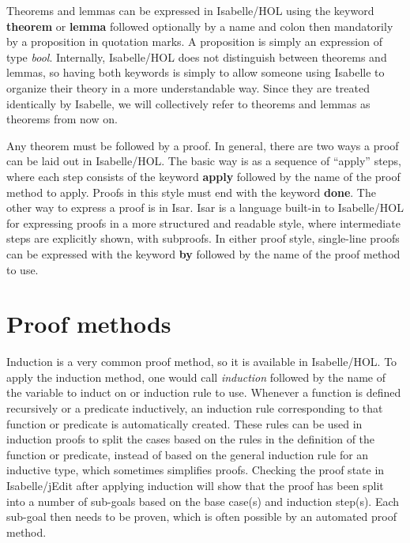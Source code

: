 \documentclass{article}
\begin{document}
Theorems and lemmas can be expressed in Isabelle/HOL using the keyword
\textbf{theorem} or \textbf{lemma} followed optionally by a name and colon then
mandatorily by a proposition in quotation
marks. A proposition is simply an expression of type \textit{bool}. Internally,
Isabelle/HOL does not distinguish between theorems and lemmas, so having both
keywords is simply to allow someone using Isabelle to organize their theory in
a more understandable way. Since they are treated identically by Isabelle, we
will collectively refer to theorems and lemmas as theorems from now on.

Any theorem must be followed by a proof. In general, there are two ways a proof
can be laid out in Isabelle/HOL. The basic way is as a sequence of ``apply''
steps, where each step consists of the keyword \textbf{apply} followed by the
name of the proof method to apply. Proofs in this style must end with the
keyword \textbf{done}. The other way to express a proof is in Isar. Isar is a
language built-in to Isabelle/HOL for expressing proofs in a more structured
and readable style, where intermediate steps are explicitly shown, with
subproofs. In either proof style, single-line proofs can be expressed with the
keyword \textbf{by} followed by the name of the proof method to use.

\section{Proof methods}

Induction is a very common proof method, so it is available in Isabelle/HOL. To
apply the induction method, one would call \textit{induction} followed by the 
name of the variable to induct on or induction rule to use. Whenever a function 
is defined recursively or a predicate inductively, an induction rule 
corresponding to that function or predicate is automatically created. These 
rules can be used in induction proofs to split the cases based on the rules in 
the definition of the function or predicate, instead of based on the general 
induction rule for an inductive type, which sometimes simplifies proofs. 
Checking the proof state in Isabelle/jEdit after 
applying induction will show that the proof has been split into a number of 
sub-goals based on the base case(s) and induction step(s). Each sub-goal then 
needs to be proven, which is often possible by an automated proof method.
\end{document}
